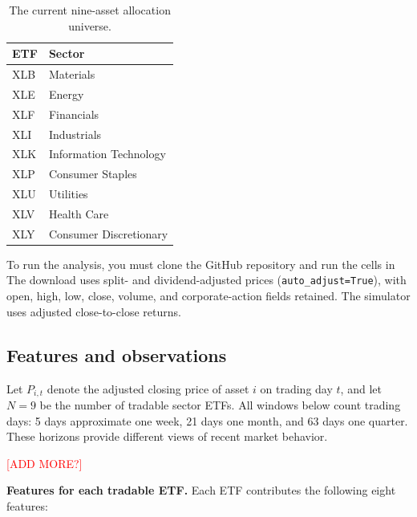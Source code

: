 \documentclass[11pt,letterpaper]{article}
\begin{document}
\begin{table}[htbp]
\centering
\small
\begin{tabular}{@{}ll@{}}
\toprule
ETF & Sector \\
\midrule
XLB & Materials \\
XLE & Energy \\
XLF & Financials \\
XLI & Industrials \\
XLK & Information Technology \\
XLP & Consumer Staples \\
XLU & Utilities \\
XLV & Health Care \\
XLY & Consumer Discretionary \\
\bottomrule
\end{tabular}
\caption{The current nine-asset allocation universe.}
\end{table}

To run the analysis, you must clone the GitHub repository and run the cells in 
The download uses split- and dividend-adjusted prices
(\texttt{auto\_adjust=True}), with open, high, low, close, volume, and corporate-action
fields retained. The simulator uses adjusted close-to-close returns.

\subsection{Features and observations}

Let $P_{i,t}$ denote the adjusted closing price of asset $i$ on trading day $t$,
and let $N=9$ be the number of tradable sector ETFs. All windows below count
trading days: 5 days approximate one week, 21 days one month, and 63 days one
quarter. These horizons provide different views of recent market behavior.

\textcolor{red}{[ADD MORE?]}

\textbf{Features for each tradable ETF.} Each ETF contributes the following
eight features:
\end{document}
